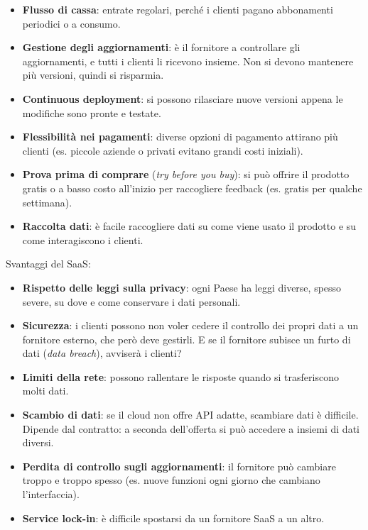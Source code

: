 \begin{itemize}
\tightlist
\item
  \textbf{Flusso di cassa}: entrate regolari, perché i clienti pagano
  abbonamenti periodici o a consumo.
\item
  \textbf{Gestione degli aggiornamenti}: è il fornitore a controllare
  gli aggiornamenti, e tutti i clienti li ricevono insieme. Non si
  devono mantenere più versioni, quindi si risparmia.
\item
  \textbf{Continuous deployment}: si possono rilasciare nuove versioni
  appena le modifiche sono pronte e testate.
\item
  \textbf{Flessibilità nei pagamenti}: diverse opzioni di pagamento
  attirano più clienti (es. piccole aziende o privati evitano grandi
  costi iniziali).
\item
  \textbf{Prova prima di comprare} (\emph{try before you buy}): si può
  offrire il prodotto gratis o a basso costo all'inizio per raccogliere
  feedback (es. gratis per qualche settimana).
\item
  \textbf{Raccolta dati}: è facile raccogliere dati su come viene usato
  il prodotto e su come interagiscono i clienti.
\end{itemize}

Svantaggi del SaaS:

\begin{itemize}
\tightlist
\item
  \textbf{Rispetto delle leggi sulla privacy}: ogni Paese ha leggi
  diverse, spesso severe, su dove e come conservare i dati personali.
\item
  \textbf{Sicurezza}: i clienti possono non voler cedere il controllo
  dei propri dati a un fornitore esterno, che però deve gestirli. E se
  il fornitore subisce un furto di dati (\emph{data breach}), avviserà i
  clienti?
\item
  \textbf{Limiti della rete}: possono rallentare le risposte quando si
  trasferiscono molti dati.
\item
  \textbf{Scambio di dati}: se il cloud non offre API adatte, scambiare
  dati è difficile. Dipende dal contratto: a seconda dell'offerta si può
  accedere a insiemi di dati diversi.
\item
  \textbf{Perdita di controllo sugli aggiornamenti}: il fornitore può
  cambiare troppo e troppo spesso (es. nuove funzioni ogni giorno che
  cambiano l'interfaccia).
\item
  \textbf{Service lock-in}: è difficile spostarsi da un fornitore SaaS a
  un altro.
\end{itemize}

